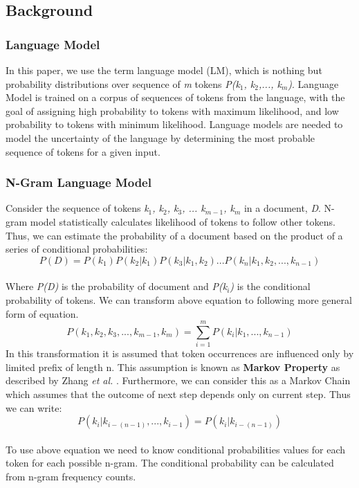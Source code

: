 \documentclass[conference]{IEEEtran}
\begin{document}
\subsection{Background}

\subsubsection{Language Model}

In this paper, we use the term language model (LM), which is nothing but probability distributions over sequence of \textit{m} tokens \textit{P(k$_1$, k$_2$,..., k$_m$)}. Language Model is trained on a corpus of sequences of tokens from the language, with the goal of assigning high probability to tokens with maximum likelihood, and low probability to tokens with minimum likelihood. Language models are needed to model the uncertainty of the language by determining the most probable sequence of tokens for a given input. 

\subsubsection{N-Gram Language Model}
Consider the sequence of tokens \textit{k$_1$, k$_2$, k$_3$, ... k$_{m-1}$, k$_m$} in a document, \textit{D}. N-gram model statistically calculates likelihood of tokens to follow other tokens. Thus, we can estimate the probability of a document based on the product of a series of conditional probabilities: 
\\
\begin{equation}
P(D) = P(k_1) P(k_2 | k_1) P(k_3 | k_1, k_2) ... P(k_n | k_1, k_2,..., k_{n-1})
\end{equation}
\\
Where \textit{P(D)} is the probability of document and \textit{P(k$_i$)} is the conditional probability of tokens. 
We can transform above equation to following more general form of equation. 
\\
\begin{equation}
P(k_1, k_2, k_3,..., k_{m-1}, k_m) = \sum_{i=1}^{m} P(k_i | k_1,..., k_{n-1})
\end{equation}
In this transformation it is assumed that token occurrences are influenced only by limited prefix of length n. This assumption is known as \textbf{Markov Property} as described by Zhang \textit{et al.} \cite{Zhang}. Furthermore, we can consider this as a Markov Chain which assumes that the outcome of next step depends only on current step. Thus we can write:
\\
\begin{equation}
P(k_i|k_{i-(n-1)},..., k_{i-1})=P(k_i|k_{i-(n-1)})
\end{equation}
\\
To use above equation we need to know conditional probabilities values for each token for each possible n-gram. The conditional probability can be calculated from n-gram frequency counts.
\end{document}
